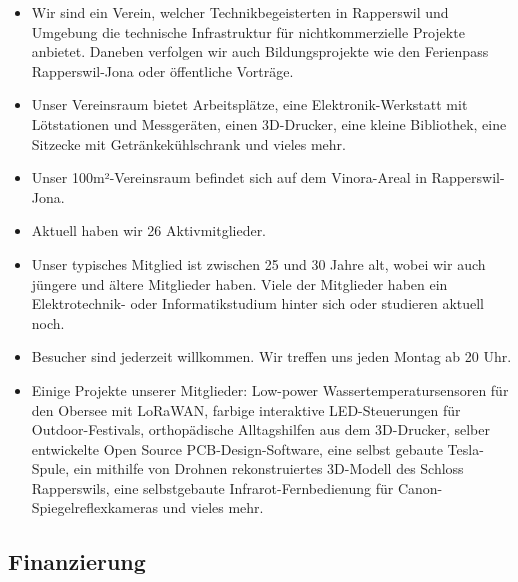 \documentclass[10pt,a4paper,parskip,fleqn]{scrartcl}
\newcommand{\membercount}{26}
\begin{document}
\begin{itemize}
	\item Wir sind ein Verein, welcher Technikbegeisterten in Rapperswil und
		Umgebung die technische Infrastruktur für nichtkommerzielle Projekte
		anbietet. Daneben verfolgen wir auch Bildungsprojekte wie den Ferienpass
		Rapperswil-Jona oder öffentliche Vorträge.
	\item Unser Vereinsraum bietet Arbeitsplätze, eine Elektronik-Werkstatt mit
		Lötstationen und Messgeräten, einen 3D-Drucker, eine kleine Bibliothek, eine
		Sitzecke mit Getränkekühlschrank und vieles mehr.
	\item Unser 100m²-Vereinsraum befindet sich auf dem Vinora-Areal in
		Rapperswil-Jona.
	\item Aktuell haben wir \membercount{} Aktivmitglieder.
	\item Unser typisches Mitglied ist zwischen 25 und 30 Jahre alt, wobei wir
		auch jüngere und ältere Mitglieder haben. Viele der Mitglieder haben ein
		Elektrotechnik- oder Informatikstudium hinter sich oder studieren aktuell
		noch.
	\item Besucher sind jederzeit willkommen. Wir treffen uns jeden Montag ab 20
		Uhr.
	\item Einige Projekte unserer Mitglieder: Low-power Wassertemperatursensoren
		für den Obersee mit LoRaWAN, farbige interaktive LED-Steuerungen für
		Outdoor-Festivals, orthopädische Alltagshilfen aus dem 3D-Drucker, selber
		entwickelte Open Source PCB-Design-Software, eine selbst gebaute
		Tesla-Spule, ein mithilfe von Drohnen rekonstruiertes 3D-Modell des Schloss
		Rapperswils, eine selbstgebaute Infrarot-Fernbedienung für
		Canon-Spiegelreflexkameras und vieles mehr.
\end{itemize}

\subsection{Finanzierung}
\end{document}
